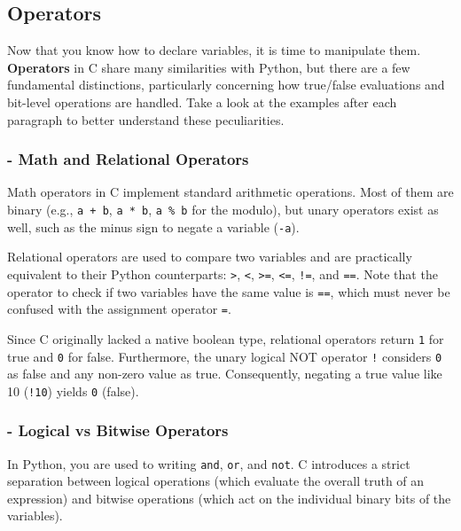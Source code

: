 \hrulefill

\subsection{Operators}

Now that you know how to declare variables, it is time to manipulate them. \textbf{Operators} in C share many similarities with Python, but there are a few fundamental distinctions, particularly concerning how true/false evaluations and bit-level operations are handled. Take a look at the examples after each paragraph to better understand these peculiarities. 

\subsubsection{- Math and Relational Operators}

Math operators in C implement standard arithmetic operations. Most of them are binary (e.g., \texttt{a + b}, \texttt{a * b}, \texttt{a \% b} for the modulo), but unary operators exist as well, such as the minus sign to negate a variable (\texttt{-a}).

Relational operators are used to compare two variables and are practically equivalent to their Python counterparts: \texttt{>}, \texttt{<}, \texttt{>=}, \texttt{<=}, \texttt{!=}, and \texttt{==}. Note that the operator to check if two variables have the same value is \texttt{==}, which must never be confused with the assignment operator \texttt{=}.

Since C originally lacked a native boolean type, relational operators return \texttt{1} for true and \texttt{0} for false. Furthermore, the unary logical NOT operator \texttt{!} considers \texttt{0} as false and any non-zero value as true. Consequently, negating a true value like 10 (\texttt{!10}) yields \texttt{0} (false). 



\subsubsection{- Logical vs Bitwise Operators}

In Python, you are used to writing \texttt{and}, \texttt{or}, and \texttt{not}. C introduces a strict separation between logical operations (which evaluate the overall truth of an expression) and bitwise operations (which act on the individual binary bits of the variables).

